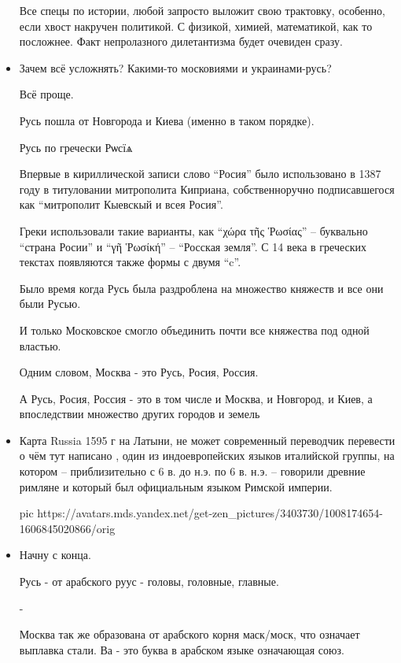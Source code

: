 \begin{itemize}
Все спецы по истории, любой запросто выложит свою трактовку, особенно, если
хвост накручен политикой. С физикой, химией, математикой, как то посложнее.
Факт непролазного дилетантизма будет очевиден сразу.

\item {}

Зачем всё усложнять? Какими-то московиями и украинами-русь?

Всё проще.

Русь пошла от Новгорода и Киева (именно в таком порядке).

Русь по гречески Рѡсїѧ

Впервые в кириллической записи слово “Росия” было использовано в 1387 году в
титуловании митрополита Киприана, собственноручно подписавшегося как
“митрополит Кыевскый и всея Росия”.

Греки использовали такие варианты, как “χώρα τῆς Ῥωσίας” – буквально “страна
Росии” и “γῆ Ῥωσίκή” – “Росская земля”. С 14 века в греческих текстах
появляются также формы с двумя “c”.

Было время когда Русь была раздроблена на множество княжеств и все они были
Русью.

И только Московское смогло объединить почти все княжества под одной властью.

Одним словом, Москва - это Русь, Росия, Россия.

А Русь, Росия, Россия - это в том числе и Москва, и Новгород, и Киев, а
впоследствии множество других городов и земель

\item {}

Карта Russia 1595 г на Латыни, не может современный переводчик перевести о чём
тут написано , один из индоевропейских языков италийской группы, на котором –
приблизительно с 6 в. до н.э. по 6 в. н.э. – говорили древние римляне и который
был официальным языком Римской империи.

\ifcmt
pic https://avatars.mds.yandex.net/get-zen_pictures/3403730/1008174654-1606845020866/orig
\fi

\item {}

Начну с конца.

Русь - от арабского руус - головы, головные, главные.

-

Москва так же образована от арабского корня маск/моск, что означает выплавка
стали. Ва - это буква в арабском языке означающая союз.


\end{itemize}

